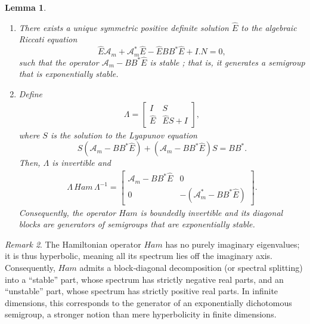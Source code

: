 \documentclass[10pt, a4]{amsart}
\theoremstyle{plain}
\newtheorem{lemma}{Lemma}[section]
\theoremstyle{definition}
\theoremstyle{remark}
\newtheorem{remark}[lemma]{Remark}
\numberwithin{equation}{section}
\begin{document}
  \begin{lemma}\label{le3.10}
\begin{enumerate}
  \item[(1)] There exists a unique symmetric positive definite solution \(\hat{E}\) to the algebraic Riccati equation
  \begin{equation}\label{eq3.33}
  \hat{E}\mathcal{A}_m+\mathcal{A}_m^*\hat{E}-\hat{E}BB^*\hat{E}+I.N=0,
  \end{equation}
  such that the operator \(\mathcal{A}_m-BB^*\hat{E}\) is stable ; that is, it generates a semigroup that is exponentially stable.
  
  \item[(2)] Define 
  \begin{align}
      \Lambda = \begin{bmatrix}
  I & S\\[1mm]
  \hat{E} & \hat{E}S+I
  \end{bmatrix},
  \end{align}
  where \(S\) is the solution to the Lyapunov equation
  \[
  S(\mathcal{A}_m-BB^*\hat{E}) + (\mathcal{A}_m-BB^*\hat{E})S = BB^*.
  \]
  Then, \(\Lambda\) is invertible and
  \begin{align}
    \Lambda\, Ham\, \Lambda^{-1} = \begin{bmatrix}
  \mathcal{A}_m-BB^*\hat{E} & 0\\[1mm]
  0 & -(\mathcal{A}_m^*-BB^*\hat{E})
  \end{bmatrix}.  
  \end{align}
  Consequently, the operator \(Ham\) is boundedly invertible and its diagonal blocks are generators of semigroups that are exponentially stable.
\end{enumerate}
\end{lemma}

\begin{remark}
The Hamiltonian operator $Ham$ has no purely imaginary eigenvalues; it is thus hyperbolic, meaning all its spectrum lies off the imaginary axis. Consequently, $Ham$ admits a block‑diagonal decomposition (or spectral splitting) into a “stable” part, whose spectrum has strictly negative real parts, and an “unstable” part, whose spectrum has strictly positive real parts. In infinite dimensions, this corresponds to the generator of an exponentially dichotomous semigroup, a stronger notion than mere hyperbolicity in finite dimensions.
\end{remark}
\end{document}
